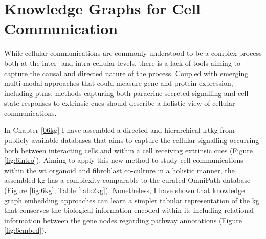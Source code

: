 
\newpage
\section{Knowledge Graphs for Cell Communication}

While cellular communications are commonly understood to be a complex process both at the inter- and intra-cellular levels, there is a lack of tools aiming to capture the causal and directed nature of the process. Coupled with emerging multi-modal approaches that could measure gene and protein expression, including \acrshort{ptm}s, methods capturing both paracrine secreted signalling and cell-state responses to extrinsic cues should describe a holistic view of cellular communications.

In Chapter \ref{06kg} I have assembled a directed and hierarchical \acrfull{lrtkg} from publicly available databases that aims to capture the cellular signalling occurring both between interacting cells and within a cell receiving extrinsic cues (Figure \ref{fig:6intro}). Aiming to apply this new method to study cell communications within the \acrshort{wt} organoid and fibroblast co-culture in a holistic manner, the assembled \acrshort{kg} has a complexity comparable to the curated OmniPath database (Figure \ref{fig:6kg}, Table \ref{tab:2kg}). Nonetheless, I have shown that knowledge graph embedding approaches can learn a simpler tabular representation of the \acrshort{kg} that conserves the biological information encoded within it; including relational information between the gene nodes regarding pathway annotations (Figure \ref{fig:6embed}). 

